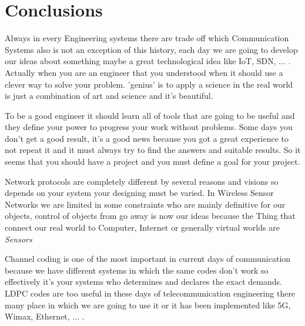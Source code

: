 
\chapter{Conclusions} %

\label{Conclusion} %



Always in every Engineering systems there are trade off which Communication Systems also is not an exception of this history, each day we are going to develop our ideas about something maybe a great technological idea like IoT, SDN, ... . Actually when you are an engineer that you understood when it should use a clever way to solve your problem. 'genius' is to apply a science in the real world is just a combination of art and science and it's beautiful.

To be a good engineer it should learn all of tools that are going to be useful and they define your power to progress your work without problems. Some days you don't get a good result, it's a good news because you got a great experience to not repeat it and it must always try to find the answers and suitable results. So it seems that you should have a project and you must define a goal for your project.

Network protocols are completely different by several reasons and visions so depends on your system your designing must be varied. In Wireless Sensor Networks we are limited in some constraints who are mainly definitive for our objects, control of objects from go away is now our ideas because the Thing that connect our real world to Computer, Internet or generally virtual worlds are \textit{Sensors}

Channel coding is one of the most important in current days of communication because we have different systems in which the same codes don't work so effectively it's your systems who determines and declares the exact demands. LDPC codes are too useful in these days of telecommunication engineering there many place in which we are going to use it or it has been implemented like 5G, Wimax, Ethernet, ... .

     




